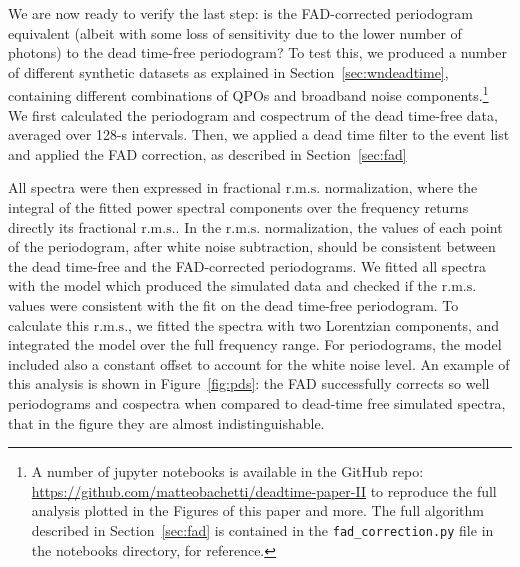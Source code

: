 \documentclass[twocolumn]{aastex61}
\newcommand{\rms}{\ensuremath{\mathrm{r.m.s.}}\xspace}
\begin{document}
\begin{figure*}
    \caption{Periodograms and cospectra from a simulation with four Lorentzian features (at 50, 200, 300 and 400 Hz) with 40-Hz full with at half maximum (FWHM). 
    We plotted and fitted periodograms and cospectra before and after applying a 2.5\,ms dead time filter
    The total \rms before dead time was 40\% and the incident photon flux 400 ct/s. 
    There is no significant difference between FAD-normalized and deadtime-free periodograms and cospectra, that are almost indistinguishable (note also the agreement between all best-fit Lorentzians).
    For comparison, we also plot the cospectrum without FAD (pink), showing very different amplitudes for the four Lorentzians, due to dead time.
    }
    \label{fig:pds}
\end{figure*}

We are now ready to verify the last step: is the FAD-corrected periodogram equivalent (albeit with some loss of sensitivity due to the lower number of photons) to the dead time-free periodogram?
To test this, we produced a number of different synthetic datasets as explained in Section~\ref{sec:wndeadtime}, containing different combinations of QPOs and broadband noise components.\footnote{A number of jupyter notebooks is available in the GitHub repo: \href{https://github.com/matteobachetti/deadtime-paper-II}{https://github.com/matteobachetti/deadtime-paper-II} to reproduce the full analysis plotted in the Figures of this paper and more. The full algorithm described in Section~\ref{sec:fad} is contained in the \texttt{fad\_correction.py} file in the notebooks directory, for reference.}
We first calculated the periodogram and cospectrum of the dead time-free data, averaged over 128-s intervals.
Then, we applied a dead time filter to the event list and applied the FAD correction, as described in Section~\ref{sec:fad}

All spectra were then expressed in fractional \rms normalization, where the integral of the fitted power spectral components over the frequency returns directly its fractional \rms.
In the \rms normalization, the values of each point of the periodogram, after white noise subtraction, should be consistent between the dead time-free and the FAD-corrected periodograms.
We fitted all spectra with the model which produced the simulated data and checked if the \rms values were consistent with the fit on the dead time-free periodogram.
To calculate this \rms, we fitted the spectra with two Lorentzian components, and integrated the model over the full frequency range.
For periodograms, the model included also a constant offset to account for the white noise level.
An example of this analysis is shown in Figure~\ref{fig:pds}: the FAD successfully corrects so well periodograms and cospectra when compared to dead-time free simulated spectra, that in the figure they are almost indistinguishable.
\end{document}
